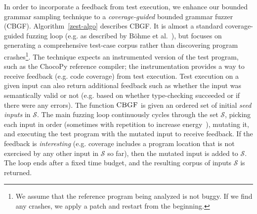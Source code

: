 \documentclass[conference]{IEEEtran}
\begin{document}
In order to incorporate a feedback from test execution, we enhance our bounded grammar sampling technique to a \emph{coverage-guided} bounded grammar fuzzer (CBGF). Algorithm~\ref{zest-algo} describes CBGF. It is almost a standard coverage-guided fuzzing loop (e.g. as described by B{\"o}hme et al.~\cite{Bohme17}), but focuses on generating a comprehensive test-case corpus rather than discovering program crashes\footnote{We assume that the reference program being analyzed is not buggy. If we find any crashes, we apply a patch and restart from the beginning.}. The technique expects an instrumented version of the test program, such as the ChocoPy reference compiler; the instrumentation provides a way to receive feedback (e.g. code coverage) from test execution. Test execution on a given input can also return additional feedback such as whether the input was semantically valid or not (e.g. based on whether type-checking succeeded or if there were any errors). The function $\textproc{CBGF}$ is given an ordered set of initial \emph{seed inputs} in $\mathcal{S}$. The main fuzzing loop continuously cycles through the set $\mathcal{S}$, picking each input in order (sometimes with repetition to increase energy~\cite{Bohme17}), mutating it, and executing the test program with the mutated input to receive feedback. If the feedback is \emph{interesting} (e.g. coverage includes a program location that is not exercised by any other input in $\mathcal{S}$ so far), then the mutated input is added to $\mathcal{S}$. The loop ends after a fixed time budget, and the resulting corpus of inputs $\mathcal{S}$ is returned.
\end{document}
